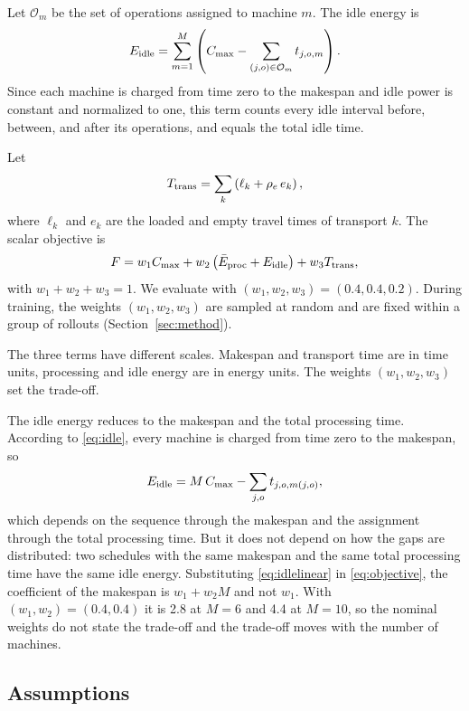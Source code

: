 Let $\mathcal{O}_m$ be the set of operations assigned to machine $m$. The
idle energy is
\begin{equation}
E_{\mathrm{idle}}=\sum_{m=1}^{M}\left(
C_{\max}-\sum_{(j,o)\in\mathcal{O}_m} t_{j,o,m}\right).
\label{eq:idle}
\end{equation}
Since each machine is charged from time zero to the makespan and idle power is
constant and normalized to one, this term counts every idle interval before,
between, and after its operations, and \Eidle{} equals the total idle time.

Let
\begin{equation}
T_{\mathrm{trans}}=\sum_{k}\left(\ell_k+\rho_e\,e_k\right),
\label{eq:trans}
\end{equation}
where $\ell_k$ and $e_k$ are the loaded and empty travel times of transport
$k$. The
scalar objective is
\begin{equation}
F=w_{1}C_{\max}+w_{2}\left(\bar{E}_{\mathrm{proc}}+E_{\mathrm{idle}}\right)+w_{3}T_{\mathrm{trans}},
\label{eq:objective}
\end{equation}
with $w_{1}+w_{2}+w_{3}=1$. We evaluate with $(w_1,w_2,w_3)=(0.4,0.4,0.2)$.
During training, the weights $(w_1,w_2,w_3)$ are sampled at random and are fixed within a
group of rollouts (Section~\ref{sec:method}).

The three terms have different scales. Makespan and transport time are in
time units, processing and idle energy are in energy units. The weights $(w_1,w_2,w_3)$
set the trade-off.

The idle energy reduces to the makespan and the total processing time. According to \eqref{eq:idle}, 
every machine is charged from time zero to the makespan, so
\begin{equation}
E_{\mathrm{idle}}=M\,C_{\max}-\sum_{j,o} t_{j,o,m(j,o)},
\label{eq:idlelinear}
\end{equation}
which depends on the sequence through the makespan and the assignment through
the total processing time. But it does not depend on how the gaps are distributed:
two schedules with the same makespan and the same total processing time have
the same idle energy. Substituting \eqref{eq:idlelinear} in
\eqref{eq:objective}, the coefficient of the makespan is $w_1+w_2M$ and not
$w_1$. With $(w_1,w_2)=(0.4,0.4)$ it is 2.8 at $M=6$ and 4.4 at $M=10$, so the
nominal weights do not state the trade-off and the trade-off moves with the
number of machines.

\subsection{Assumptions}


